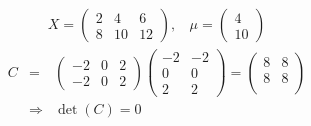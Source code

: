 \documentclass[a4paper,11pt]{article}
\begin{document}
\begin{eqnarray*}
X=
\left(
\begin{array}{cccc}
2 & 4 & 6 \\
8 & 10 & 12  
\end{array}
\right)
, \:\:\:\:
\mu = 
\left(
\begin{array}{cccc}
4  \\
10  
\end{array}
\right) 
\end{eqnarray*}
\begin{eqnarray*}
C &=&
\left(
\begin{array}{cccc}
-2 & 0 & 2 \\
-2 & 0 & 2  
\end{array}
\right) 
\left(
\begin{array}{cccc}
-2 & -2\\
0 & 0 \\
2 & 2  
\end{array}
\right) 
= 
\left(
\begin{array}{cccc}
8 & 8\\
8 & 8 \\  
\end{array}
\right) \\
&\Rightarrow& \det(C) =0
\end{eqnarray*}
\end{document}
